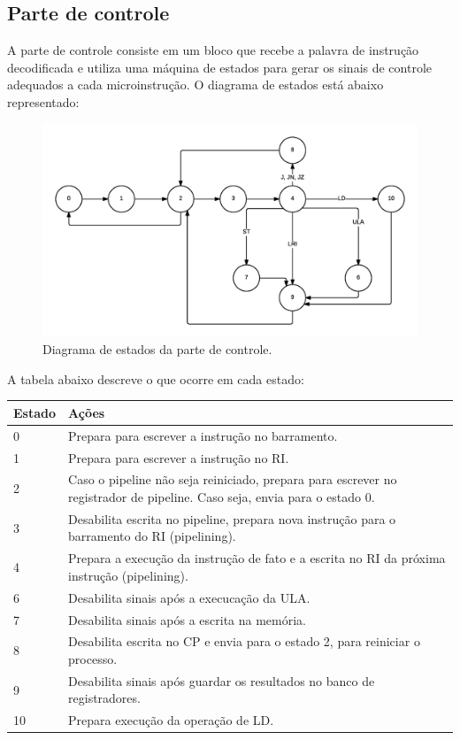 \documentclass[a4paper]{article}
\begin{document}
\subsection{Parte de controle}
A parte de controle consiste em um bloco que recebe a palavra de instrução decodificada
e utiliza uma máquina de estados para gerar os sinais de controle adequados
a cada microinstrução. O diagrama de estados está abaixo representado:

\begin{figure}[H]
	\centering
	\includegraphics[scale=0.6]{img/statediag}
	\caption{Diagrama de estados da parte de controle.}
	\label{fig:op}
\end{figure}

A tabela abaixo descreve o que ocorre em cada estado:

\begin{table}[H]
	\centering
	\begin{tabular}{l | p{10cm}}
		Estado	& Ações\\
		\hline
		0	& Prepara para escrever a instrução no barramento.\\
		1	& Prepara para escrever a instrução no RI.\\
		2	& Caso o pipeline não seja reiniciado, prepara para escrever no
			  registrador de pipeline. Caso seja, envia para o estado 0.\\
		3	& Desabilita escrita no pipeline, prepara nova instrução para o
			  barramento do RI (pipelining).\\
		4 	& Prepara a execução da instrução de fato e a escrita no RI da 
			  próxima instrução (pipelining).\\
		6	& Desabilita sinais após a execucação da ULA.\\
		7	& Desabilita sinais após a escrita na memória.\\
		8	& Desabilita escrita no CP e envia para o estado 2, para
			  reiniciar o processo.\\
		9	& Desabilita sinais após guardar os resultados no banco de registradores.\\
		10	& Prepara execução da operação de LD.\\
		\hline
	\end{tabular}
\end{table}
\end{document}
